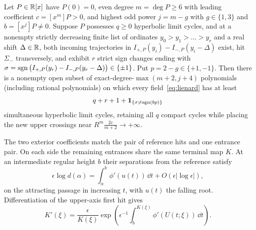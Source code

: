 \begin{proposition}\label{prop:cap-transfer}
Let $P\in\mathbb{R}[x]$ have $P(0)=0$, even degree $m=\deg P\ge 6$ with leading coefficient $c=[x^m]P>0$, and highest odd power $j=m-g$ with $g\in\{1,3\}$ and $b=[x^j]P\neq 0$. Suppose $P$ possesses $q\ge 0$ hyperbolic limit cycles, and at a nonempty strictly decreasing finite list of ordinates $y_0>y_1>\dots>y_r$ and a real shift $\Delta\in\mathbb{R}$, both incoming trajectories in $I_{+,P}(y_i)-I_{-,P}(y_i-\Delta)$ exist, hit $\Sigma_-$ transversely, and exhibit $r$ strict sign changes ending with $\sigma=\operatorname{sgn}\big(I_{+,P}(y_r)-I_{-,P}(y_r-\Delta)\big)\in\{\pm 1\}$. Put $p=2-g\in\{+1,-1\}$. Then there is a nonempty open subset of exact-degree-$\max(m+2,j+4)$ polynomials (including rational polynomials) on which every field~\eqref{eq:lienard} has at least
\begin{equation}\label{eq:cap-count}
  q + r + 1 + \mathbf{1}_{\{\sigma\neq\operatorname{sgn}(bp)\}}
\end{equation}
simultaneous hyperbolic limit cycles, retaining all $q$ compact cycles while placing the new upper crossings near $R^m\frac{2c}{m+2}\to+\infty$.
\end{proposition}
The two exterior coefficients match the pair of reference hits
and one entrance pair. On each side the remaining entrances share
the same terminal map $K$. At an intermediate regular height $b$
their separations from the reference satisfy
\begin{equation}\label{eq:entry-distortion}
 \epsilon\log d(\alpha)=\int_\alpha^b\phi'(u(t))\,\dd t
                    +O(\epsilon|\log\epsilon|),
\end{equation}
on the attracting passage in increasing $t$, with $u(t)$ the falling
root. Differentiation of the upper-axis first hit gives
\begin{equation}\label{eq:Ks-deriv}
 K'(\xi)=\frac{\epsilon}{K(\xi)}\exp\!\left(
 \epsilon^{-1}\int_b^{K(\xi)}\phi'(U(t;\xi))\,\dd t\right).
\end{equation}

